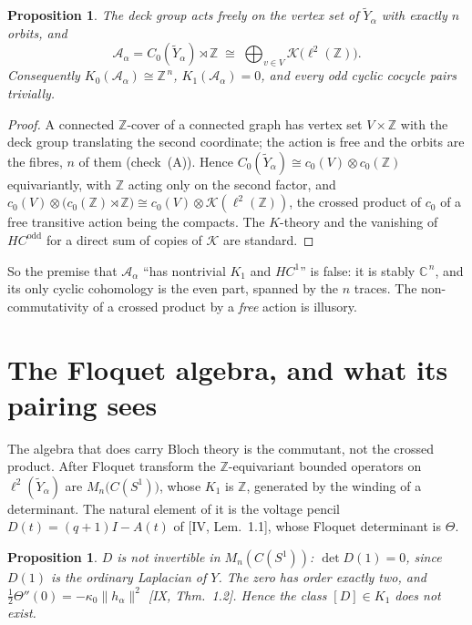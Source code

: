 \documentclass[11pt]{amsart}
\numberwithin{equation}{section}
\newtheorem{proposition}[theorem]{Proposition}
\theoremstyle{definition}
\theoremstyle{remark}
\newcommand{\Z}{\mathbb{Z}}
\newcommand{\C}{\mathbb{C}}
\newcommand{\cA}{\mathcal{A}}
\newcommand{\cK}{\mathcal{K}}
\newcommand{\Yt}{\widetilde Y_\alpha}
\begin{document}
\begin{proposition}\label{prop:compacts}
The deck group acts freely on the vertex set of $\Yt$ with exactly $n$ orbits, and
\[
\cA_\alpha=C_0(\Yt)\rtimes\Z\;\cong\;\bigoplus_{v\in V}\cK\bigl(\ell^2(\Z)\bigr).
\]
Consequently $K_0(\cA_\alpha)\cong\Z^{\,n}$, $K_1(\cA_\alpha)=0$, and every odd cyclic
cocycle pairs trivially.
\end{proposition}

\begin{proof}
A connected $\Z$-cover of a connected graph has vertex set $V\times\Z$ with the deck group
translating the second coordinate; the action is free and the orbits are the fibres, $n$
of them (check~(A)). Hence $C_0(\Yt)\cong c_0(V)\otimes c_0(\Z)$ equivariantly, with $\Z$
acting only on the second factor, and
$c_0(V)\otimes\bigl(c_0(\Z)\rtimes\Z\bigr)\cong c_0(V)\otimes\cK(\ell^2(\Z))$, the
crossed product of $c_0$ of a free transitive action being the compacts. The
$K$-theory and the vanishing of $HC^{\mathrm{odd}}$ for a direct sum of copies of $\cK$
are standard.
\end{proof}

So the premise that $\cA_\alpha$ ``has nontrivial $K_1$ and $HC^1$'' is false: it is stably
$\C^{\,n}$, and its only cyclic cohomology is the even part, spanned by the $n$ traces.
The non-commutativity of a crossed product by a \emph{free} action is illusory.

\section{The Floquet algebra, and what its pairing sees}\label{sec:floquet}

The algebra that does carry Bloch theory is the commutant, not the crossed product. After
Floquet transform the $\Z$-equivariant bounded operators on $\ell^2(\Yt)$ are
$M_n\bigl(C(S^1)\bigr)$, whose $K_1$ is $\Z$, generated by the winding of a determinant.
The natural element of it is the voltage pencil $D(t)=(q+1)I-A(t)$ of [IV, Lem.~1.1],
whose Floquet determinant is $\Theta$.

\begin{proposition}\label{prop:notinv}
$D$ is not invertible in $M_n(C(S^1))$: $\det D(1)=0$, since $D(1)$ is the ordinary
Laplacian of $Y$. The zero has order exactly two, and
$\tfrac12\Theta''(0)=-\kappa_0\|h_\alpha\|^2$ [IX, Thm.~1.2]. Hence the class $[D]\in K_1$
does not exist.
\end{proposition}
\end{document}
